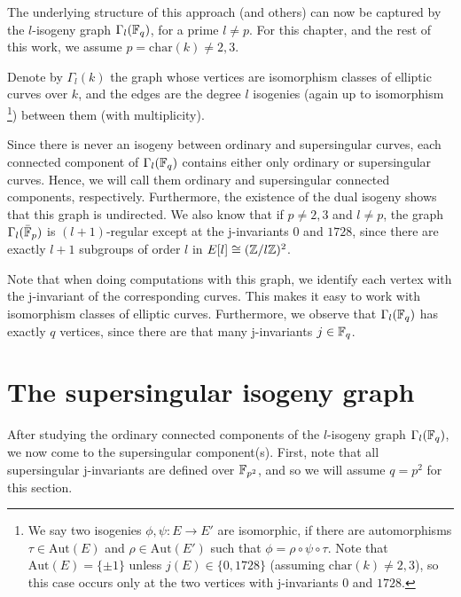 The underlying structure of this approach (and others) can now be captured by the $l$-isogeny graph $\Gamma_l(\mathbb{F}_q)$, for a prime $l \neq p$.
For this chapter, and the rest of this work, we assume $p = \mathrm{char}(k) \neq 2, 3$.
\begin{definition}
    Denote by $\Gamma_l(k)$ the graph whose vertices are isomorphism classes of elliptic curves over $k$, and the edges are the degree $l$ isogenies (again up to isomorphism
    \footnote{We say two isogenies $\phi, \psi: E \to E'$ are isomorphic, if there are automorphisms $\tau \in \mathrm{Aut}(E)$ and $\rho \in \mathrm{Aut}(E')$ such that $\phi = \rho \circ \psi \circ \tau$.
    Note that $\mathrm{Aut}(E) = \{ \pm 1 \}$ unless $j(E) \in \{ 0, 1728 \}$ (assuming $\mathrm{char}(k) \neq 2, 3$), so this case occurs only at the two vertices with j-invariants $0$ and $1728$.}) 
    between them (with multiplicity).
\end{definition}
Since there is never an isogeny between ordinary and supersingular curves, each connected component of $\Gamma_l(\mathbb{F}_q)$ contains either only ordinary or supersingular curves.
Hence, we will call them ordinary and supersingular connected components, respectively.
Furthermore, the existence of the dual isogeny shows that this graph is undirected.
We also know that if $p \neq 2, 3$ and $l \neq p$, the graph $\Gamma_l(\bar{\mathbb{F}}_p)$ is $(l + 1)$-regular except at the j-invariants $0$ and $1728$, since there are exactly $l + 1$ subgroups of order $l$ in $E[l] \cong (\mathbb{Z}/l\mathbb{Z})^2$.

Note that when doing computations with this graph, we identify each vertex with the j-invariant of the corresponding curves.
This makes it easy to work with isomorphism classes of elliptic curves.
Furthermore, we observe that $\Gamma_l(\mathbb{F}_q)$ has exactly $q$ vertices, since there are that many j-invariants $j \in \mathbb{F}_q$.



\section{The supersingular isogeny graph}
\label{sec:supersingular_isogeny_graph}
After studying the ordinary connected components of the $l$-isogeny graph $\Gamma_l(\mathbb{F}_q)$, we now come to the supersingular component(s).
First, note that all supersingular j-invariants are defined over $\mathbb{F}_{p^2}$, and so we will assume $q = p^2$ for this section.


